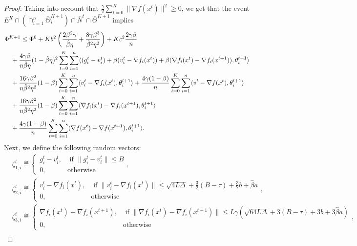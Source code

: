 \documentclass[a4paper,11pt]{article}
\begin{document}
\begin{proof}
    Taking into account that $\frac{\gamma}{2}\sum_{t=0}^{K}\|\nabla f(x^t)\|^2 \ge 0$, we get that the event $E^K\cap \left(\cap_{i=1}^n\overline{\Theta}^{K+1}_i\right)\cap\overline{N}^t \cap \overline{\Theta}^{K+1}$ implies 
    \begin{align*}
    &\Phi^{K+1}
    \le \Phi^0 
    + K b^2\left(\frac{2\beta^2\gamma}{\hat{\beta}\eta} + \frac{8\gamma\beta^3}{\hat{\beta}^2\eta^2}\right)
    + Kc^2\frac{2\gamma\beta}{n}\\
    & \quad + \frac{4\gamma\beta}{n\hat{\beta}\eta}(1-\hat{\beta}\eta)^2\sum_{t=0}^{K}\sum_{i=1}^n\<(g_i^{t} - v_i^{t}) + \beta(v_i^{t} - \nabla f_i(x^{t})) + \beta(\nabla f_i(x^{t})-\nabla f_i(x^{t+1})), \theta^{t+1}_i>\\
    &\quad + \frac{16\gamma\beta^2}{n\hat{\beta}^2\eta^2}(1-\beta)\sum_{t=0}^{K}\sum_{i=1}^n\<v_i^t - \nabla f_i(x^{t}), \theta^{t+1}_i>
    + \frac{4\gamma(1-\beta)}{n}\sum_{t=0}^{K}\sum_{i=1}^n\<v^t - \nabla f(x^{t}), \theta^{t+1}_i>\\
    &\quad + \frac{16\gamma\beta^2}{n\hat{\beta}^2\eta^2}(1-\beta)\sum_{t=0}^{K}\sum_{i=1}^n\<\nabla f_i(x^t) - \nabla f_i(x^{t+1}), \theta^{t+1}_i>\\
    &\quad + \frac{4\gamma(1-\beta)}{n}\sum_{t=0}^{K}\sum_{i=1}^n\<\nabla f(x^t) - \nabla f(x^{t+1}), \theta^{t+1}_i>.
    \end{align*}
    Next, we define the following random vectors:
    \begin{align*}
    &\zeta_{1,i}^t \eqdef \begin{cases} 
    g_i^t - v_i^t, &\text{ if } \|g_i^t-v_i^t\| \le B\\
    0, &\text{otherwise}
    \end{cases},\\
    &\zeta_{2,i}^t \eqdef \begin{cases} 
    v_i^t - \nabla f_i(x^t), &\text{ if } \|v_i^t - \nabla f_i(x^t)\| \le \sqrt{4L\Delta} + \frac{3}{2}(B-\tau) + \frac{3}{2}b + \hat{\beta}a\\
	0, &\text{otherwise}
    \end{cases}, \\
    &\zeta_{3,i}^t \eqdef \begin{cases} 
    \nabla f_i(x^t) - \nabla f_i(x^{t+1}), &\text{ if } \|\nabla f_i(x^t) - \nabla f_i(x^{t+1})\| \le L\gamma\left(\sqrt{64L\Delta} + 3(B-\tau) + 3 b + 3\hat{\beta} a\right)\\
	0, &\text{otherwise}
    \end{cases}, \\

\end{align*}
\end{proof}
\end{document}
